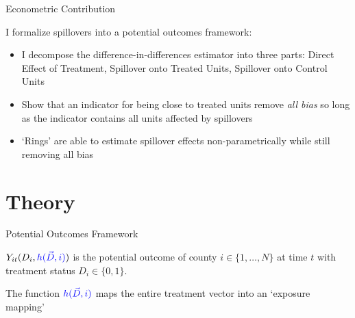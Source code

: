 \documentclass[aspectratio=169]{beamer}
\begin{document}
\begin{frame}{Econometric Contribution}

    I formalize spillovers into a potential outcomes framework:
 
    \begin{citecolor}
    \end{citecolor}

    \begin{itemize}
        \vspace{2.5mm}
        \item I decompose the difference-in-differences estimator into three parts: Direct Effect of Treatment, Spillover onto Treated Units, Spillover onto Control Units
        
        \vspace{2.5mm}
        \item Show that an indicator for being close to treated units remove \textit{all bias} so long as the indicator contains all units affected by spillovers
        
        \vspace{2.5mm}
        \item `Rings' are able to estimate spillover effects non-parametrically while still removing all bias
    \end{itemize} 

\end{frame}





\section{Theory}

\begin{frame}{Potential Outcomes Framework}
    
    $Y_{it}(D_i, \textcolor{blue}{h(\vec{D}, i)})$ is the potential outcome of county $i \in \{ 1, \dots, N \}$ at time $t$ with treatment status $D_i \in \{0, 1\}$.

    The function $\textcolor{blue}{h(\vec{D}, i)}$ maps the entire treatment vector into an `exposure mapping'
\end{frame}
\end{document}
